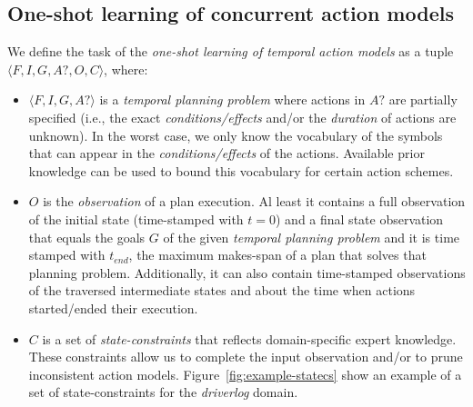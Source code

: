 \documentclass{ecai}
\newcommand{\tup}[1]{{\langle #1 \rangle}}
\begin{document}
\subsection{One-shot learning of concurrent action models}
\label{subsec:ones}
We define the task of the {\em one-shot learning of temporal action models} as a tuple $\tup{F,I,G,A?,O,C}$, where:

\begin{itemize}
\item $\tup{F,I,G,A?}$ is a {\em temporal planning problem} where actions in $A?$ are partially specified (i.e., the exact {\em conditions/effects} and/or the {\em duration} of actions are unknown). In the worst case, we only know the vocabulary of the symbols that can appear in the {\em conditions/effects} of the actions. Available prior knowledge can be used to bound this vocabulary for certain action schemes.
\item $O$ is the {\em observation} of a plan execution. Al least it contains a full observation of the initial state (time-stamped with $t=0$) and a final state observation that equals the goals $G$ of the given {\em temporal planning problem} and it is time stamped with $t_{end}$, the maximum makes-span of a plan that solves that planning problem.  Additionally, it can also contain time-stamped observations of the traversed intermediate states and about the time when actions started/ended their execution.
\item $C$ is a set of {\em state-constraints} that reflects domain-specific expert knowledge. These constraints allow us to complete the input observation and/or to prune inconsistent action models. Figure~\ref{fig:example-statecs} show an example of a set of state-constraints for the {\em driverlog} domain.
\end{itemize}
\end{document}
